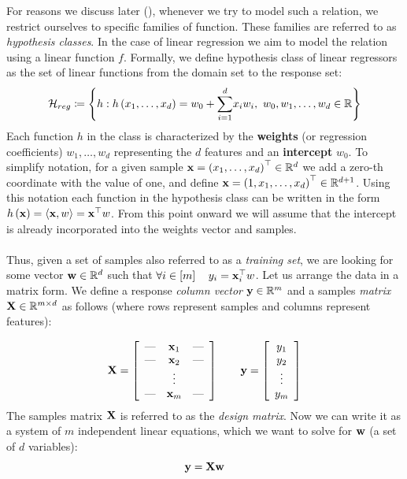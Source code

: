 For reasons we discuss later (), whenever we try to model such a relation, we restrict ourselves to specific families of function. These families are referred to as \textit{hypothesis classes}. In the case of linear regression we aim to model the relation using a linear function $f$. Formally, we define hypothesis class of linear regressors as the set of linear functions from the domain set to the response set: 
\begin{equation}\label{eqn:lin_reg_h}
\mathcal{H}_{reg}\coloneqq\left\{h: h\left(x_1,\ldots,x_d\right)=w_0+\underset{i=1}{\overset{d}{\sum}}x_iw_i,\,\, w_0,w_1,\ldots,w_d\in\mathbb{R}\right\}
\end{equation}
Each function $h$ in the class is characterized by the \textbf{weights} (or regression coefficients) $w_1,\ldots,w_d$ representing the $d$ features and an \textbf{intercept} $w_0$. To simplify notation, for a given sample $\mathbf{x}=\left(x_1,\ldots,x_d\right)^\top \in \mathbb{R}^d$ we add a zero-th coordinate with the value of one, and define $\mathbf{x}=\left(1,x_1,\ldots,x_d\right)^\top \in \mathbb{R}^{d+1}$. Using this notation each function in the hypothesis class can be written in the form $h\left(\mathbf{x}\right)=\left<\mathbf{x},w\right>=\mathbf{x}^\top w$. From this point onward we will assume that the intercept is already incorporated into the weights vector and samples.
\\
\\
Thus, given a set of samples \trainset also referred to as a \textit{training set}, we are looking for some vector $\mathbf{w}\in\mathbb{R}^{d}$ such that $\forall i\in\left[m\right]\quad y_i=\mathbf{x}^\top_i w$. Let us arrange the data in a matrix form. We define a response \textit{column vector} $\mathbf{y}\in\mathbb{R}^m$ and a samples \textit{matrix} $\mathbf{X}\in\mathbb{R}^{m\times d}$ as follows (where rows represent samples and columns represent features):

$$
\mathbf{X} =
\left[
\begin{array}{ccc}
\hbox{---} & \mathbf{x}_1 & \hbox{---} \\
\hbox{---} & \mathbf{x}_2 & \hbox{---} \\
		 & \vdots    & \\
\hbox{---} & \mathbf{x}_m & \hbox{---}
\end{array}
\right]\quad\quad
\mathbf{y}=\left[\begin{array}{c} y_1 \\ y_2 \\ \vdots \\ y_m \end{array}\right]
$$
The samples matrix $\mathbf{X}$ is referred to as the \textit{design matrix}. Now we can write it as a system of $m$ independent linear equations, which we want to solve for $\mathbf{w}$ (a set of $d$ variables): 
\begin{equation}
\mathbf{y}=\mathbf{X}\mathbf{w}
\label{eqn:lin_reg_model}
\end{equation}

